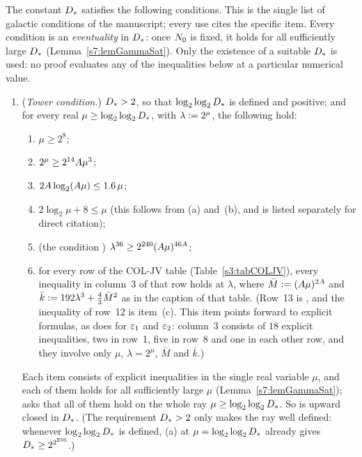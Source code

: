\begin{condition}\label{s1:condGamma}
The constant $D_{*}$ satisfies the following conditions. This is the single list
of galactic conditions of the manuscript; every use cites the specific item.
Every condition is an \emph{eventuality} in $D_{*}$: once $N_{0}$ is fixed, it
holds for all sufficiently large $D_{*}$ (Lemma~\ref{s7:lemGammaSat}). Only the
existence of a suitable $D_{*}$ is used: no proof evaluates any of the
inequalities below at a particular numerical value.
\begin{enumerate}
\item[\Gc{1}] (\emph{Tower condition.})
$D_{*}>2$, so that $\log_2\log_2D_{*}$ is defined and positive; and for every real
$\mu\ge\log_2\log_2D_{*}$, with $\lambda\mathrel{:=}2^\mu$, the following hold:
\begin{enumerate}
\item[(a)] $\mu\ge2^8$;
\item[(b)] $2^\mu\ge2^{14}A\mu^3$;
\item[(c)] $2A\log_2(A\mu)\le1.6\,\mu$;
\item[(d)] $2\log_2\mu+8\le\mu$ (this follows from (a) and~(b), and is listed
separately for direct citation);
\item[(e)] (the condition \Gstar)
$\lambda^{36}\ge2^{240}(A\mu)^{46A}$;
\item[(f)] for every row of the COL-JV table (Table~\ref{s3:tabCOLJV}), every
inequality in column~3 of that row holds at $\lambda$, where
$\bar M\mathrel{:=}(A\mu)^{2A}$ and $\bar k\mathrel{:=}192\lambda^3+\frac43\bar M^2$ as in
the caption of that table. (Row~13 is \Gstar, and the inequality of row~12 is
item~(c). This item points forward to explicit formulas, as  does for
$\varepsilon_{1}$ and $\varepsilon_{2}$: column~3 consists of $18$ explicit inequalities, two in
row~1, five in row~8 and one in each other row, and they involve only $\mu$,
$\lambda=2^\mu$, $\bar M$ and $\bar k$.)
\end{enumerate}
Each item consists of explicit inequalities in the single real variable $\mu$,
and each of them holds for all sufficiently large $\mu$
(Lemma~\ref{s7:lemGammaSat});  asks that
all of them hold on the whole ray $\mu\ge\log_2\log_2D_{*}$. So  is upward
closed in $D_{*}$. (The requirement $D_{*}>2$ only makes the ray well
defined: whenever $\log_2\log_2D_{*}$ is defined, (a) at
$\mu=\log_2\log_2D_{*}$ already gives $D_{*}\ge2^{2^{256}}$.)


\end{enumerate}
\end{condition}
